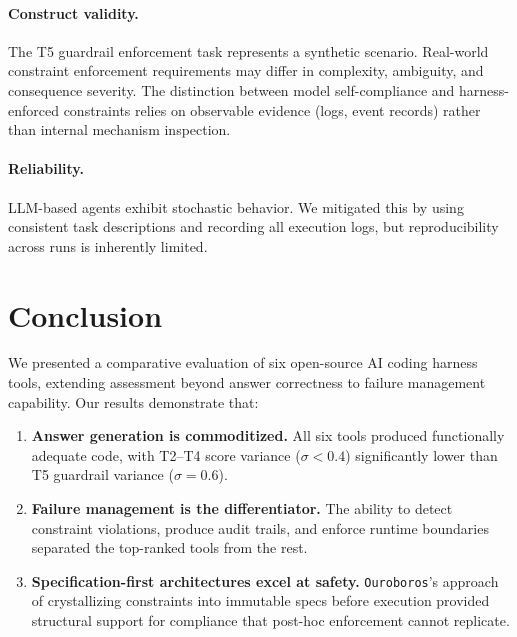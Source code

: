 \documentclass[11pt,a4paper]{article}
\newcommand{\tool}[1]{\texttt{#1}}
\begin{document}
\paragraph{Construct validity.}
The T5 guardrail enforcement task represents a synthetic scenario.
Real-world constraint enforcement requirements may differ in complexity, ambiguity, and consequence severity.
The distinction between model self-compliance and harness-enforced constraints relies on observable evidence (logs, event records) rather than internal mechanism inspection.

\paragraph{Reliability.}
LLM-based agents exhibit stochastic behavior.
We mitigated this by using consistent task descriptions and recording all execution logs, but reproducibility across runs is inherently limited.

\section{Conclusion}
\label{sec:conclusion}

We presented a comparative evaluation of six open-source AI coding harness tools, extending assessment beyond answer correctness to failure management capability.
Our results demonstrate that:

\begin{enumerate}
  \item \textbf{Answer generation is commoditized.} All six tools produced functionally adequate code, with T2--T4 score variance ($\sigma < 0.4$) significantly lower than T5 guardrail variance ($\sigma = 0.6$).

  \item \textbf{Failure management is the differentiator.} The ability to detect constraint violations, produce audit trails, and enforce runtime boundaries separated the top-ranked tools from the rest.

  \item \textbf{Specification-first architectures excel at safety.} \tool{Ouroboros}'s approach of crystallizing constraints into immutable specs before execution provided structural support for compliance that post-hoc enforcement cannot replicate.
\end{enumerate}
\end{document}
